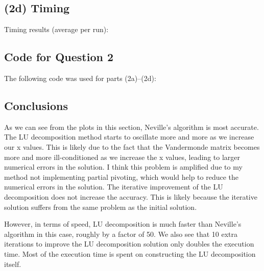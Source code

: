 \documentclass{article}
\newcommand{\CodeDir}{Code}
\begin{document}
\subsection{(2d) Timing}

Timing results (average per run):
\begin{itemize}
  
\end{itemize}

\subsection{Code for Question 2}
The following code was used for parts (2a)--(2d):


\subsection{Conclusions}
As we can see from the plots in this section, Neville's algorithm is most accurate.
The LU decomposition method starts to oscillate more and more as we increase our x values.
This is likely due to the fact that the Vandermonde matrix becomes more and more ill-conditioned as we increase the x values, leading to larger numerical errors in the solution.
I think this problem is amplified due to my method not implementing partial pivoting, which would help to reduce the numerical errors in the solution.
The iterative improvement of the LU decomposition does not increase the accuracy.
This is likely because the iterative solution suffers from the same problem as the initial solution.

However, in terms of speed, LU decomposition is much faster than Neville's algorithm in this case, roughly by a factor of 50.
We also see that 10 extra iterations to improve the LU decomposition solution only doubles the execution time.
Most of the execution time is spent on constructing the LU decomposition itself.
\end{document}
